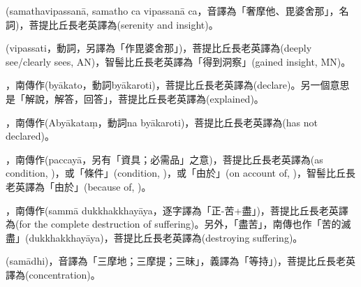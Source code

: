 \startitemgroup[noteitems]
\item{}(samathavipassanā, samatho ca vipassanā ca，音譯為「奢摩他、毘婆舍那」，名詞)，菩提比丘長老英譯為(serenity and insight)。
\item{}(vipassati，動詞，另譯為「作毘婆舍那」)，菩提比丘長老英譯為(deeply see/clearly sees, AN)，智髻比丘長老英譯為「得到洞察」(gained insight, MN)。
\stopitemgroup

\startitemgroup[noteitems]
\item{}，南傳作(byākato，動詞byākaroti)，菩提比丘長老英譯為(declare)。另一個意思是「解說，解答，回答」，菩提比丘長老英譯為(explained)。
\item{}，南傳作(Abyākataṃ，動詞na byākaroti)，菩提比丘長老英譯為(has not declared)。
\stopitemgroup

\startitemgroup[noteitems]
\item{}，南傳作(paccayā，另有「資具；必需品」之意)，菩提比丘長老英譯為(as condition, )，或「條件」(condition, )，或「由於」(on account of, )，智髻比丘長老英譯為「由於」(because of, )。
\stopitemgroup

\startitemgroup[noteitems]
\item{}，南傳作(sammā dukkhakkhayāya，逐字譯為「正-苦+盡」)，菩提比丘長老英譯為(for the complete destruction of suffering)。另外，「盡苦」，南傳也作「苦的滅盡」(dukkhakkhayāya)，菩提比丘長老英譯為(destroying suffering)。
\stopitemgroup

\startitemgroup[noteitems]
\item{}(samādhi)，音譯為「三摩地；三摩提；三昧」，義譯為「等持」)，菩提比丘長老英譯為(concentration)。
\stopitemgroup

